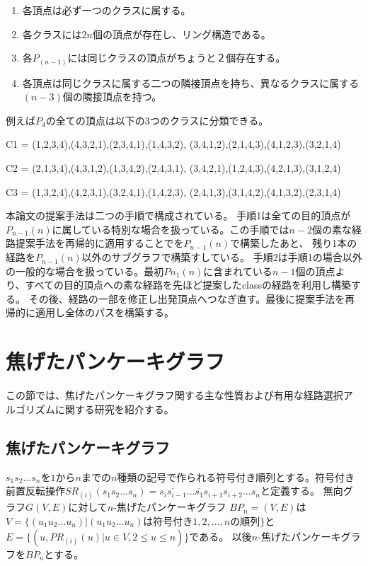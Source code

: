 \documentclass[11pt,a4j]{jsarticle}
\theoremstyle{plain}
\begin{document}
\begin{enumerate}
 \item 各頂点は必ず一つのクラスに属する。
 \item 各クラスには2$n$個の頂点が存在し、リング構造である。
 \item 各$P_(n-1)$には同じクラスの頂点がちょうと２個存在する。
 \item 各頂点は同じクラスに属する二つの隣接頂点を持ち、異なるクラスに属する$(n-3)$個の隣接頂点を持つ。
\end{enumerate}

例えば$P_4$の全ての頂点は以下の3つのクラスに分類できる。
\begin{description}
\item {C1} = {(1,2,3,4),(4,3,2,1),(2,3,4,1),(1,4,3,2), (3,4,1,2),(2,1,4,3),(4,1,2,3),(3,2,1,4)}
\item {C2} = {(2,1,3,4),(4,3,1,2),(1,3,4,2),(2,4,3,1), (3,4,2,1),(1,2,4,3),(4,2,1,3),(3,1,2,4)}
\item {C3} = {(1,3,2,4),(4,2,3,1),(3,2,4,1),(1,4,2,3), (2,4,1,3),(3,1,4,2),(4,1,3,2),(2,3,1,4)}
\end{description}
本論文\cite{pan-n2s}の提案手法は二つの手順で構成されている。
手順1は全ての目的頂点が$P_{n-1}(n)$に属している特別な場合を扱っている。この手順では$n-2$個の素な経路提案手法を再帰的に適用することでを$P_{n-1}(n)$で構築したあと、
残り1本の経路を$P_{n-1}(n)$以外のサブグラフで構築すしている。
手順2は手順1の場合以外の一般的な場合を扱っている。最初$P{n_1}(n)$に含まれている$n-1$個の頂点より、すべての目的頂点への素な経路を先ほど提案したclassの経路を利用し構築する。
その後、経路の一部を修正し出発頂点へつなぎ直す。最後に提案手法を再帰的に適用し全体のパスを構築する。


\section{焦げたパンケーキグラフ}
この節では、焦げたパンケーキグラフ関する主な性質および有用な経路選択アルゴリズムに関する研究を紹介する。
\subsection{焦げたパンケーキグラフ}
$s_1s_2\dots s_n$を$1$から$n$までの$n$種類の記号で作られる符号付き順列とする。符号付き前置反転操作$SR_{(i)}(s_1s_2\dots s_n)=\overline{s_is_{i-1}}\dots \overline{s_1}s_{i+1}s_{i+2}\dots s_n$と定義する。
無向グラフ$G(V,E)$に対して$n$-焦げたパンケーキグラフ $BP_n=(V,E)$は$V=\{(u_1u_2\dots u_n)|(u_1u_2\dots u_n)は符号付き1,2,\dots ,nの順列\}$と$E=\{(u,PR_{(i)}(u) | u \in V, 2 \leq u \leq n)\}$である。
以後$n$-焦げたパンケーキグラフを$BP_n$とする。
\end{document}
